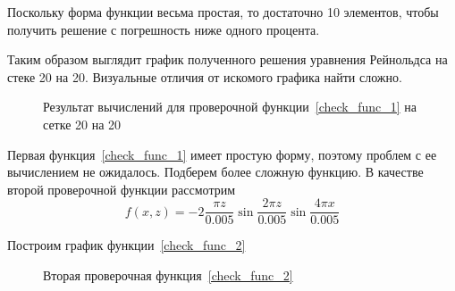 \documentclass[a4paper,14pt]{extarticle}
\begin{document}
\noindent Поскольку форма функции весьма простая, то достаточно 10 элементов, чтобы получить решение с погрешность ниже одного процента.

Таким образом выглядит график полученного решения уравнения Рейнольдса на стеке 20 на 20. Визуальные отличия от искомого графика найти сложно.
\begin{figure}[!htbp]
	\caption{Результат вычислений для проверочной функции~\eqref{check_func_1} на сетке 20 на 20}
	\label{res_check_func_1}
\end{figure}


Первая функция~\eqref{check_func_1} имеет простую форму, поэтому проблем с ее вычислением не ожидалось. Подберем более сложную функцию. В качестве второй проверочной функции рассмотрим
\begin{equation}
	f(x, z) = -2 \frac{\pi z}{0.005} \sin{\frac{2 \pi z}{0.005}} \sin{\frac{4 \pi x}{0.005}}
	\label{check_func_2}
\end{equation}

Построим график функции~\eqref{check_func_2}
\begin{figure}[!htbp]
	\caption{Вторая проверочная функция~\eqref{check_func_2}}
	\label{check_func_2_pic}
\end{figure}
\end{document}
